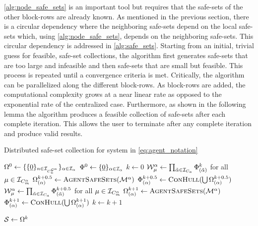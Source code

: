 \autoref{alg:node_safe_sets} is an important tool but requires that the safe-sets of the other block-rows are already known. As mentioned in the previous section, there is a circular dependency where the neighboring safe-sets depend on the local safe-sets which, using \autoref{alg:node_safe_sets}, depends on the neighboring safe-sets. This circular dependency is addressed in \autoref{alg:safe_sets}. Starting from an initial, trivial guess for feasible, safe-set collections, the algorithm first generates safe-sets that are too large and infeasible and then safe-sets that are small but feasible. This process is repeated until a convergence criteria is met. Critically, the algorithm can be parallelized along the different block-rows. As block-rows are added, the computational complexity grows at a near linear rate as opposed to the exponential rate of the centralized case. Furthermore, as shown in the following lemma the algorithm produces a feasible collection of safe-sets after each complete iteration. This allows the user to terminate after any complete iteration and produce valid results. 
\begin{algorithm}[t]
\caption{Distributed safe-set collection for system in \autoref{eq:agent_notation}}\label{alg:safe_sets}
\begin{algorithmic}[1]
\State $\Omega^0\gets\{\{\underline{0}\}_{n\in\idxset{\gnumnodes[\agentidx]}}\}_{\agentidx\in\mathcal{I}_\agentidx}$
\State $\Phi^0\gets\{\underline{0}\}_{\alpha\in\mathcal{I}_{\alpha}}$
\State $k\gets0$
\Repeat
		\State $\wcon[\modeidx]^\agentidx\gets\prod_{\tilde{\agentidx}\in\idxset{\numagents}}\Phi^{k}_{(\tilde\agentidx)}$ for all $\modeidx\in\idxset{\nummodes[\agentidx]}$
	\EndParFor
		\State $\Omega^{k+0.5}_{(\agentidx)}\gets\Call{AgentSafeSets}{\modes[\agentidx]}$
		\State $\Phi^{k+0.5}_{(\agentidx)}\gets\Call{ConHull}{\bigcup\Omega^{k+0.5}_{(\agentidx)}}$
	\EndParFor
		\State $\wcon[\modeidx]^\agentidx\gets\prod_{\tilde{\agentidx}\in\idxset{\numagents}}\Phi^{k+0.5}_{(\tilde\agentidx)}$ for all $\modeidx\in\idxset{\nummodes[\agentidx]}$
	\EndParFor
		\State $\Omega^{k+1}_{(\agentidx)}\gets\Call{AgentSafeSets}{\modes[\agentidx]}$
		\State $\Phi^{k+1}_{(\agentidx)}\gets\Call{ConHull}{\bigcup\Omega^{k+1}_{(\agentidx)}}$
	\EndParFor
	\State $k\gets k+1$

\State $\mathcal{S}\gets\Omega^k$
\EndProcedure
\end{algorithmic}
\end{algorithm}

